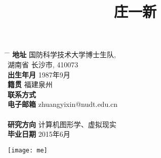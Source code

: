 \documentclass[20pt]{article} %
\begin{document}

\title{庄一新} %
\begin{minipage}{0.5\textwidth}
\centering
\begin{tabbing}%
\hspace{3cm} \= \hspace{4cm} \= \kill %
{\bf 地址} \> 国防科学技术大学博士生队,\\%
\> 湖南省 长沙市, 410073 \\%
{\bf 出生年月} \> 1987年9月 \\ %
{\bf 籍贯} \> 福建泉州 \\%
{\bf 联系方式}  \\ %
{\bf 电子邮箱} \> zhuangyixin@nudt.edu.cn \\ \\%
{\bf 研究方向} \> 计算机图形学、虚拟现实 \\ %
{\bf 毕业日期} \> 2015年6月 \\ %
\end{tabbing}%
\end{minipage}
\begin{minipage}{0.5\textwidth}
\hspace{3cm}
  \texttt{[image: me]}\\
\end{minipage}
\end{document}
